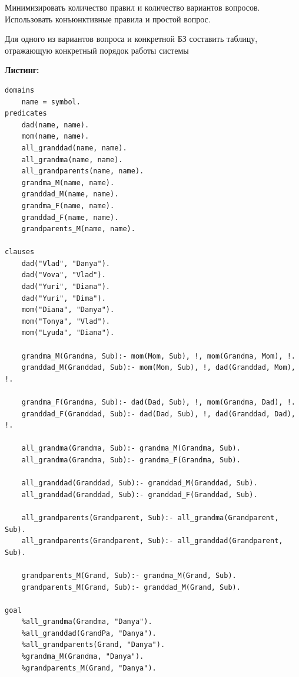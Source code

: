 \documentclass[12pt, a4paper]{extarticle}
\begin{document}
Минимизировать количество правил и количество вариантов вопросов. Использовать конъюнктивные правила и простой вопрос.

Для одного из вариантов вопроса и конкретной БЗ составить таблицу, отражающую конкретный порядок работы системы

\hfill

\textbf{Листинг:}

\begin{lstlisting}
domains
	name = symbol.
predicates
	dad(name, name).
	mom(name, name).
	all_granddad(name, name).
	all_grandma(name, name).
	all_grandparents(name, name).
	grandma_M(name, name).
	granddad_M(name, name).
	grandma_F(name, name).
	granddad_F(name, name).
	grandparents_M(name, name).

clauses
	dad("Vlad", "Danya").
	dad("Vova", "Vlad").
	dad("Yuri", "Diana").
	dad("Yuri", "Dima").
	mom("Diana", "Danya").	
	mom("Tonya", "Vlad").
	mom("Lyuda", "Diana").
	
	grandma_M(Grandma, Sub):- mom(Mom, Sub), !, mom(Grandma, Mom), !.
	granddad_M(Granddad, Sub):- mom(Mom, Sub), !, dad(Granddad, Mom), !.
	
	grandma_F(Grandma, Sub):- dad(Dad, Sub), !, mom(Grandma, Dad), !.
	granddad_F(Granddad, Sub):- dad(Dad, Sub), !, dad(Granddad, Dad), !.
	
	all_grandma(Grandma, Sub):- grandma_M(Grandma, Sub).
	all_grandma(Grandma, Sub):- grandma_F(Grandma, Sub).
	
	all_granddad(Granddad, Sub):- granddad_M(Granddad, Sub).
	all_granddad(Granddad, Sub):- granddad_F(Granddad, Sub).
	
	all_grandparents(Grandparent, Sub):- all_grandma(Grandparent, Sub).
	all_grandparents(Grandparent, Sub):- all_granddad(Grandparent, Sub).
	
	grandparents_M(Grand, Sub):- grandma_M(Grand, Sub).
	grandparents_M(Grand, Sub):- granddad_M(Grand, Sub).

goal
	%all_grandma(Grandma, "Danya").
	%all_granddad(GrandPa, "Danya").
	%all_grandparents(Grand, "Danya").
	%grandma_M(Grandma, "Danya").
	%grandparents_M(Grand, "Danya").
\end{lstlisting}
\newpage
\end{document}

